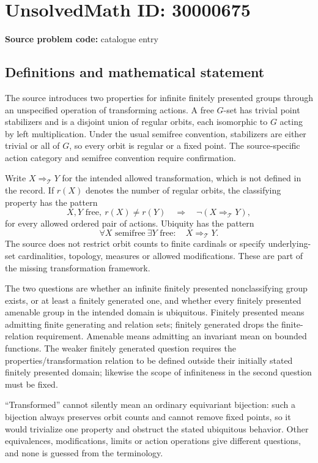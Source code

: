 \documentclass[11pt]{article}
\begin{document}
\section*{UnsolvedMath ID: 30000675}
\textbf{Source problem code:} catalogue entry
\subsection{Definitions and mathematical statement}
The source introduces two properties for infinite finitely presented groups through an unspecified operation of transforming actions. A free $G$-set has trivial point stabilizers and is a disjoint union of regular orbits, each isomorphic to $G$ acting by left multiplication. Under the usual semifree convention, stabilizers are either trivial or all of $G$, so every orbit is regular or a fixed point. The source-specific action category and semifree convention require confirmation.

Write $X\Rightarrow_{\mathcal T}Y$ for the intended allowed transformation, which is not defined in the record. If $r(X)$ denotes the number of regular orbits, the classifying property has the pattern
\[
 X,Y\text{ free},\ r(X)\ne r(Y)
       \quad\Longrightarrow\quad \neg(X\Rightarrow_{\mathcal T}Y),
\]
for every allowed ordered pair of actions. Ubiquity has the pattern
\[
 \forall X\text{ semifree}\ \exists Y\text{ free}:\quad
                       X\Rightarrow_{\mathcal T}Y.
\]
The source does not restrict orbit counts to finite cardinals or specify underlying-set cardinalities, topology, measures or allowed modifications. These are part of the missing transformation framework.

The two questions are whether an infinite finitely presented nonclassifying group exists, or at least a finitely generated one, and whether every finitely presented amenable group in the intended domain is ubiquitous. Finitely presented means admitting finite generating and relation sets; finitely generated drops the finite-relation requirement. Amenable means admitting an invariant mean on bounded functions. The weaker finitely generated question requires the properties/transformation relation to be defined outside their initially stated finitely presented domain; likewise the scope of infiniteness in the second question must be fixed.

``Transformed'' cannot silently mean an ordinary equivariant bijection: such a bijection always preserves orbit counts and cannot remove fixed points, so it would trivialize one property and obstruct the stated ubiquitous behavior. Other equivalences, modifications, limits or action operations give different questions, and none is guessed from the terminology.
\end{document}
